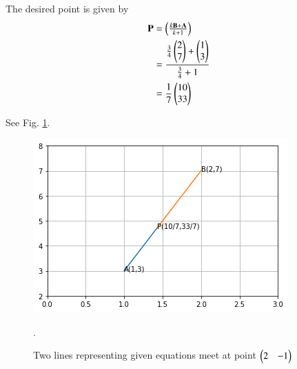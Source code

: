 
The desired point     is given by
   \begin{align}
       \mathbf{P}&=\begin{pmatrix}\frac{k\mathbf{B}+\mathbf{A}}{k+1}\end{pmatrix}\\
       &=\frac{\frac{3}{4}\begin{pmatrix}2\\7\end{pmatrix}+\begin{pmatrix}1\\3\end{pmatrix}}{\frac{3}{4}+1}\\
       &=\frac{1}{7}\begin{pmatrix}10\\33\end{pmatrix}
   \end{align}

See Fig. \ref{vec/2006/1/Fig 1.1}.
\begin{figure}[h]
\centering
\includegraphics[width=\columnwidth]{vectors/solutions/2006/1/line division.png}
\caption{Two lines representing given equations meet at point $\begin{pmatrix}2 & -1\end{pmatrix}$ }.
\label{vec/2006/1/Fig 1.1}
\end{figure}
